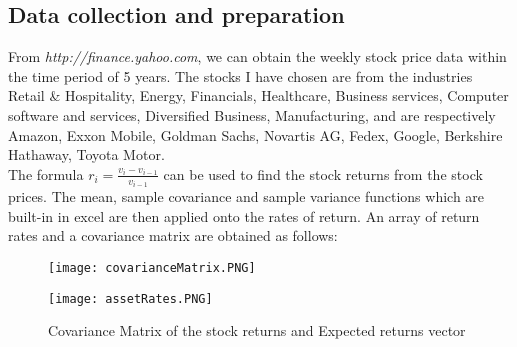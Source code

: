 \subsection{Data collection and preparation}
From \emph{http://finance.yahoo.com}, we can obtain the weekly stock price data within the time period of 5 years. The stocks I have chosen are from the industries Retail \& Hospitality, Energy, Financials, Healthcare, Business services, Computer software and services, Diversified Business, Manufacturing, and are respectively Amazon, Exxon Mobile, Goldman Sachs, Novartis AG, Fedex, Google, Berkshire Hathaway, Toyota Motor.\\[3mm]
The formula $r_{i} = \frac{v_{i}-v_{i-1}}{v_{i-1}}$ can be used to find the stock returns from the stock prices. The mean, sample covariance and sample variance functions which are built-in in excel are then applied onto the rates of return. An array of return rates and a covariance matrix are obtained as follows:
\begin{figure}[h]
  \centering
  \begin{minipage}[h]{0.85\textwidth}
    \texttt{[image: covarianceMatrix.PNG]}
  \end{minipage}
  \hfill
  \begin{minipage}[h]{0.1\textwidth}
    \texttt{[image: assetRates.PNG]}
  \end{minipage}
  \caption{Covariance Matrix of the stock returns and Expected returns vector}
\end{figure}

